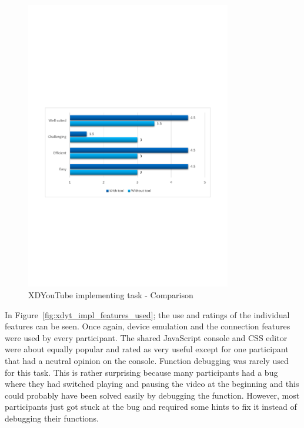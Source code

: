 \begin{figure}[H]
  \centering
    \includegraphics[width=0.8\textwidth]{images/charts/xdyt_impl_comparison.pdf}
	\caption[xdyt-impl: Comparison]{XDYouTube implementing task - Comparison}
	\label{fig:xdyt_impl_comparison}
\end{figure}

In Figure~\ref{fig:xdyt_impl_features_used}; the use and ratings of the individual features can be seen. Once again, device emulation and the connection features were used by every participant. The shared JavaScript console and CSS editor were about equally popular and rated as very useful except for one participant that had a neutral opinion on the console. Function debugging was rarely used for this task. This is rather surprising because many participants had a bug where they had switched playing and pausing the video at the beginning and this could probably have been solved easily by debugging the function. However, most participants just got stuck at the bug and required some hints to fix it instead of debugging their functions.

